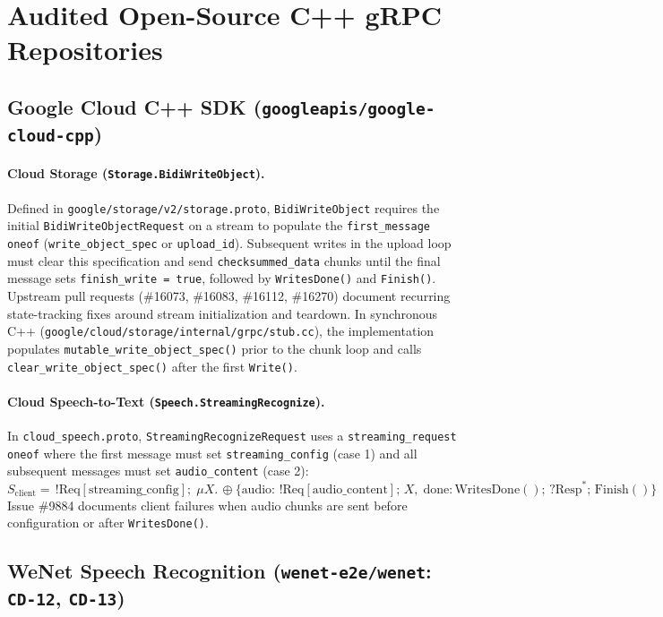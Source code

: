 \documentclass[11pt,a4paper]{article}
\begin{document}
\section{Audited Open-Source C++ gRPC Repositories}

\subsection{Google Cloud C++ SDK (\texttt{googleapis/google-cloud-cpp})}

\paragraph{Cloud Storage (\texttt{Storage.BidiWriteObject}).}
Defined in \texttt{google/storage/v2/storage.proto}, \texttt{BidiWriteObject} requires the initial \texttt{BidiWriteObjectRequest} on a stream to populate the \texttt{first\_message} \texttt{oneof} (\texttt{write\_object\_spec} or \texttt{upload\_id}). Subsequent writes in the upload loop must clear this specification and send \texttt{checksummed\_data} chunks until the final message sets \texttt{finish\_write = true}, followed by \texttt{WritesDone()} and \texttt{Finish()}. Upstream pull requests (\#16073, \#16083, \#16112, \#16270) document recurring state-tracking fixes around stream initialization and teardown. In synchronous C++ (\texttt{google/cloud/storage/internal/grpc/stub.cc}), the implementation populates \texttt{mutable\_write\_object\_spec()} prior to the chunk loop and calls \texttt{clear\_write\_object\_spec()} after the first \texttt{Write()}.

\paragraph{Cloud Speech-to-Text (\texttt{Speech.StreamingRecognize}).}
In \texttt{cloud\_speech.proto}, \texttt{StreamingRecognizeRequest} uses a \texttt{streaming\_request} \texttt{oneof} where the first message must set \texttt{streaming\_config} (case 1) and all subsequent messages must set \texttt{audio\_content} (case 2):
\[
S_{\text{client}} = \,!\text{Req}[\text{streaming\_config}];\; \mu X.\, \oplus\{\text{audio}: \,!\text{Req}[\text{audio\_content}];\, X,\; \text{done}: \text{WritesDone}();\, ?\text{Resp}^*;\, \text{Finish}()\}
\]
Issue \#9884 documents client failures when audio chunks are sent before configuration or after \texttt{WritesDone()}.

\subsection{WeNet Speech Recognition (\texttt{wenet-e2e/wenet}: \texttt{CD-12}, \texttt{CD-13})}
\end{document}

